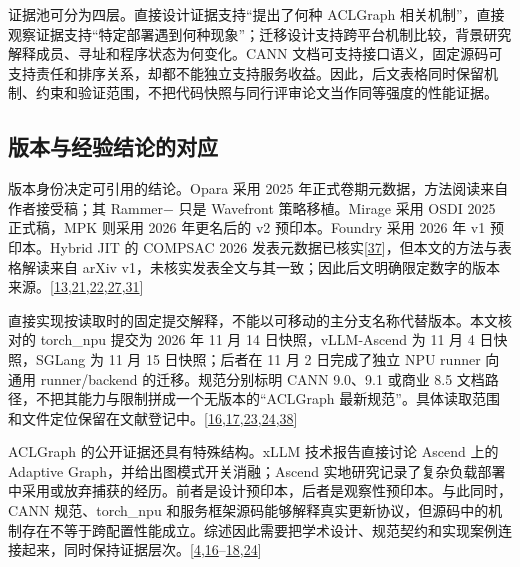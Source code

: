 \documentclass[
  UTF8,
  zihao=5]{ctexart}
\begin{document}
证据池可分为四层。直接设计证据支持``提出了何种 ACLGraph
相关机制''，直接观察证据支持``特定部署遇到何种现象''；迁移设计支持跨平台机制比较，背景研究解释成员、寻址和程序状态为何变化。CANN
文档可支持接口语义，固定源码可支持责任和排序关系，却都不能独立支持服务收益。因此，后文表格同时保留机制、约束和验证范围，不把代码快照与同行评审论文当作同等强度的性能证据。

\hypertarget{ux7248ux672cux4e0eux7ecfux9a8cux7ed3ux8bbaux7684ux5bf9ux5e94}{%
\subsection*{版本与经验结论的对应}\label{ux7248ux672cux4e0eux7ecfux9a8cux7ed3ux8bbaux7684ux5bf9ux5e94}}

版本身份决定可引用的结论。Opara 采用 2025
年正式卷期元数据，方法阅读来自作者接受稿；其 Rammer− 只是 Wavefront
策略移植。Mirage 采用 OSDI 2025 正式稿，MPK 则采用 2026 年更名后的 v2
预印本。Foundry 采用 2026 年 v1 预印本。Hybrid JIT 的 COMPSAC 2026
发表元数据已核实{[}\protect\hyperlink{ref-yadav2026hybrid}{37}{]}，但本文的方法与表格解读来自
arXiv
v1，未核实发表全文与其一致；因此后文明确限定数字的版本来源。{[}\protect\hyperlink{ref-wu2025mirage}{13},\protect\hyperlink{ref-yadav2026hybridpreprint}{21},\protect\hyperlink{ref-liu2026foundry}{22},\protect\hyperlink{ref-cheng2026mpk}{27},\protect\hyperlink{ref-chen2025opara}{31}{]}

直接实现按读取时的固定提交解释，不能以可移动的主分支名称代替版本。本文核对的
torch\_npu 提交为 2026 年 11 月 14 日快照，vLLM-Ascend 为 11 月 4
日快照，SGLang 为 11 月 15 日快照；后者在 11 月 2 日完成了独立 NPU
runner 向通用 runner/backend 的迁移。规范分别标明 CANN 9.0、9.1 或商业
8.5 文档路径，不把其能力与限制拼成一个无版本的``ACLGraph
最新规范''。具体读取范围和文件定位保留在文献登记中。{[}\protect\hyperlink{ref-vllmascend2026impl}{16},\protect\hyperlink{ref-sglang2026impl}{17},\protect\hyperlink{ref-cann850updateapi}{23},\protect\hyperlink{ref-torchnpu2026graphs}{24},\protect\hyperlink{ref-sglang2026refactor}{38}{]}

ACLGraph 的公开证据还具有特殊结构。xLLM 技术报告直接讨论 Ascend 上的
Adaptive Graph，并给出图模式开关消融；Ascend
实地研究记录了复杂负载部署中采用或放弃捕获的经历。前者是设计预印本，后者是观察性预印本。与此同时，CANN
规范、torch\_npu
和服务框架源码能够解释真实更新协议，但源码中的机制存在不等于跨配置性能成立。综述因此需要把学术设计、规范契约和实现案例连接起来，同时保持证据层次。{[}\protect\hyperlink{ref-liu2025xllm}{4},\protect\hyperlink{ref-vllmascend2026impl}{16}--\protect\hyperlink{ref-yu2026ascendfield}{18},\protect\hyperlink{ref-torchnpu2026graphs}{24}{]}
\end{document}
